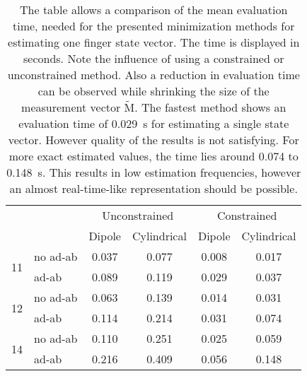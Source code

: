 \begin{table}[h]
\centering
\begin{tabular}{l l c c c c}
\toprule
 & &         			\multicolumn{2}{c}{Unconstrained}		 & 	\multicolumn{2}{c}{Constrained}\\ \cmidrule(lr){3-4} \cmidrule(lr){5-6}
 & & 								Dipole & Cylindrical & Dipole & Cylindrical \\ \midrule[2pt]
\multirow{2}{*}{11} & no ad-ab    & 0.037 & 0.077 & 0.008 & 0.017 \\ 
					& ad-ab		 & 0.089  & 0.119 & 0.029 & 0.037 \\ \midrule
\multirow{2}{*}{12} & no ad-ab    & 0.063 & 0.139 & 0.014 & 0.031 \\ 
					& ad-ab		 & 0.114 & 0.214 & 0.031 & 0.074  \\ \midrule
\multirow{2}{*}{14} & no ad-ab    & 0.110 &  0.251 & 0.025 & 0.059 \\ 
					& ad-ab		 & 0.216 & 0.409 & 0.056 & 0.148 \\										
\bottomrule
\end{tabular}
\caption[Time for one estimation step of one finger state vector]
{The table allows a comparison of the mean evaluation time, needed for the presented minimization methods for estimating one finger state vector. The time is displayed in seconds. Note the influence of using a constrained or unconstrained method. Also a reduction in evaluation time can be observed while shrinking the size of the measurement vector $ \tilde{\mathrm{M}} $. The fastest method shows an evaluation time of \SI{0.029}{\second} for estimating a single state vector. However quality of the results is not satisfying. For more exact estimated values, the time lies around 0.074 to \SI{0.148}{\second}. This results in low estimation frequencies, however an almost real-time-like representation should be possible.}
\label{tab:timeOneFing}
\end{table}

